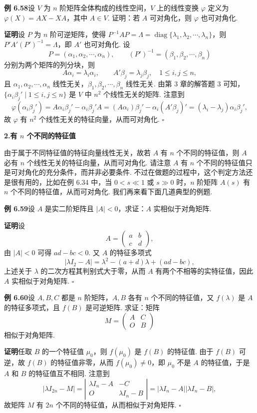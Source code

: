 \documentclass[UTF8, 12pt, fontset=fandol, oneside]{ctexart}
\begin{document}
\noindent\textbf{例 6.58}\quad 设 $V$ 为 $n$ 阶矩阵全体构成的线性空间，$V$ 上的线性变换 $\varphi$ 定义为 $\varphi(X)=AX-XA$，其中 $A\in V$. 证明：若 $A$ 可对角化，则 $\varphi$ 也可对角化.

\noindent\textbf{证明}\quad 设 $P$ 为 $n$ 阶可逆矩阵，使得 $P^{-1}AP=\Lambda=\operatorname{diag}\{\lambda_1,\lambda_2,\cdots,\lambda_n\}$，则 $P'A'(P')^{-1}=\Lambda$，即 $A'$ 也可对角化. 设
\[
P=(\alpha_1,\alpha_2,\cdots,\alpha_n),\qquad (P')^{-1}=(\beta_1,\beta_2,\cdots,\beta_n)
\]
分别为两个矩阵的列分块，则
\[
A\alpha_i=\lambda_i\alpha_i,\qquad A'\beta_j=\lambda_j\beta_j,\quad 1\le i,j\le n,
\]
且 $\alpha_1,\alpha_2,\cdots,\alpha_n$ 线性无关，$\beta_1,\beta_2,\cdots,\beta_n$ 线性无关. 由第 3 章的解答题 3 可知，$\{\alpha_i\beta_j'\mid 1\le i,j\le n\}$ 是 $V$ 中 $n^2$ 个线性无关的矩阵. 注意到
\[
\varphi(\alpha_i\beta_j')=A\alpha_i\beta_j'-\alpha_i\beta_j'A=(A\alpha_i)\beta_j'-\alpha_i(A'\beta_j)'=(\lambda_i-\lambda_j)\alpha_i\beta_j',
\]
故 $\varphi$ 有 $n^2$ 个线性无关的特征向量，从而可对角化. $\square$

\noindent\textbf{2.\quad 有 $n$ 个不同的特征值}

由于属于不同特征值的特征向量线性无关，故若 $A$ 有 $n$ 个不同的特征值，则 $A$ 必有 $n$ 个线性无关的特征向量，从而可对角化. 请注意 $A$ 有 $n$ 个不同的特征值只是可对角化的充分条件，而并非必要条件. 不过在做题的过程中，这个判定方法还是很有用的，比如在例 6.34 中，当 $0<s\ll 1$ 或 $s\gg 0$ 时，$n$ 阶矩阵 $A(s)$ 有 $n$ 个不同的特征值，从而可对角化. 我们再来看下面几道典型的例题.

\noindent\textbf{例 6.59}\quad 设 $A$ 是实二阶矩阵且 $|A|<0$，求证：$A$ 实相似于对角矩阵.

\noindent\textbf{证明}\quad 设
\[
A=\left(\begin{array}{cc}
a & b\\
c & d
\end{array}\right),
\]
由 $|A|<0$ 可得 $ad-bc<0$. 又 $A$ 的特征多项式
\[
|\lambda I_2-A|=\lambda^2-(a+d)\lambda+(ad-bc),
\]
上述关于 $\lambda$ 的二次方程其判别式大于零，从而 $A$ 有两个不相等的实特征值，因此 $A$ 实相似于对角矩阵. $\square$

\noindent\textbf{例 6.60}\quad 设 $A,B,C$ 都是 $n$ 阶矩阵，$A,B$ 各有 $n$ 个不同的特征值，又 $f(\lambda)$ 是 $A$ 的特征多项式，且 $f(B)$ 是可逆矩阵. 求证：矩阵
\[
M=\left(\begin{array}{cc}
A & C\\
O & B
\end{array}\right)
\]
相似于对角矩阵.

\noindent\textbf{证明}\quad 任取 $B$ 的一个特征值 $\mu_0$，则 $f(\mu_0)$ 是 $f(B)$ 的特征值. 由于 $f(B)$ 可逆，故 $f(B)$ 的特征值非零，从而 $f(\mu_0)\ne 0$，即 $\mu_0$ 不是 $A$ 的特征值，于是 $A$ 和 $B$ 的特征值互不相同. 注意到
\[
|\lambda I_{2n}-M|
=\left|\begin{array}{cc}
\lambda I_n-A & -C\\
O & \lambda I_n-B
\end{array}\right|
=|\lambda I_n-A||\lambda I_n-B|,
\]
故矩阵 $M$ 有 $2n$ 个不同的特征值，从而相似于对角矩阵. $\square$
\end{document}
